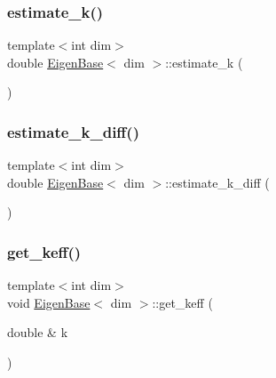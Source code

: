 \mbox{\label{class_eigen_base_a1ad5ce67d3534960731d34691db2f4d9}} 
\subsubsection{\texorpdfstring{estimate\+\_\+k()}{estimate\_k()}}
{\footnotesize\ttfamily template$<$int dim$>$ \\
double \hyperlink{class_eigen_base}{Eigen\+Base}$<$ dim $>$\+::estimate\+\_\+k (\begin{DoxyParamCaption}{ }\end{DoxyParamCaption})\hspace{0.3cm}{\ttfamily [protected]}}

\mbox{\label{class_eigen_base_ac9b7836c98e95a8be4d57b3ccf11f185}} 
\subsubsection{\texorpdfstring{estimate\+\_\+k\+\_\+diff()}{estimate\_k\_diff()}}
{\footnotesize\ttfamily template$<$int dim$>$ \\
double \hyperlink{class_eigen_base}{Eigen\+Base}$<$ dim $>$\+::estimate\+\_\+k\+\_\+diff (\begin{DoxyParamCaption}{ }\end{DoxyParamCaption})\hspace{0.3cm}{\ttfamily [protected]}}

\mbox{\label{class_eigen_base_aeb0646a8338d5929cb33d5d7aee49e08}} 
\subsubsection{\texorpdfstring{get\+\_\+keff()}{get\_keff()}}
{\footnotesize\ttfamily template$<$int dim$>$ \\
void \hyperlink{class_eigen_base}{Eigen\+Base}$<$ dim $>$\+::get\+\_\+keff (\begin{DoxyParamCaption}\item[{double \&}]{k }\end{DoxyParamCaption})}


